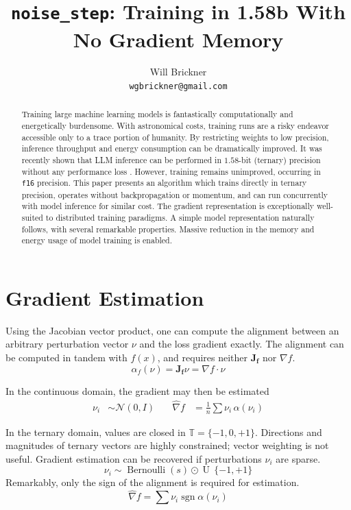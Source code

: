 \documentclass{article}
\title{\texttt{noise\_step}: Training in 1.58b With No Gradient Memory}
\author{
 Will Brickner \\
  \texttt{wgbrickner@gmail.com}
}
\begin{document}
\maketitle
\begin{abstract}
Training large machine learning models is fantastically computationally and energetically burdensome.
With astronomical costs, training runs are a risky endeavor accessible only to a trace portion of humanity.
By restricting weights to low precision, inference throughput and energy consumption can be dramatically improved.
It was recently shown that LLM inference can be performed in $1.58$-bit (ternary) precision without any performance loss \cite{ma2024era1bitllmslarge}. 
However, training remains unimproved, occurring in \texttt{f16} precision.
This paper presents an algorithm which trains directly in ternary precision, operates without backpropagation or momentum, and can run concurrently with model inference for similar cost.
The gradient representation is exceptionally well-suited to distributed training paradigms.
A simple model representation naturally follows, with several remarkable properties.
Massive reduction in the memory and energy usage of model training is enabled.
\end{abstract}


\section{Gradient Estimation}

Using the Jacobian vector product, one can compute the alignment between an arbitrary perturbation vector $\nu$ and the loss gradient exactly.
The alignment can be computed in tandem with $f(x)$, and requires neither $\mathbf{J_{f}}$ nor $\nabla f$.
\begin{equation}
  \alpha_{f}(\nu) = \mathbf{J_{f}}\nu = \nabla f \cdot \nu
\end{equation}

In the continuous domain, the gradient may then be estimated \cite{baydin2022gradientsbackpropagation}
\begin{align}
  \nu_{i} &\sim \mathcal{N}(0, I) \quad & \widehat{\nabla} f &= \frac{1}{n} \sum{\nu_{i} \, \alpha(\nu_{i})}
\end{align}

In the ternary domain, values are closed in $\mathbb{T} = \{-1, 0, +1\}$. Directions and magnitudes of ternary vectors are highly constrained; vector weighting is not useful.
Gradient estimation can be recovered if perturbations $\nu_i$ are sparse.
\begin{equation}
  \nu_i \sim \operatorname{Bernoulli}(s) \odot \operatorname{U} \, \{-1, +1\}
\end{equation}
Remarkably, only the sign of the alignment is required for estimation.
\begin{equation}
  \widehat{\nabla} f = \sum{\nu_i \operatorname{sgn} \alpha(\nu_i)}
\end{equation}
\end{document}
